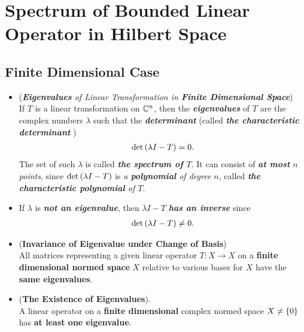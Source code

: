\documentclass[11pt]{article}
\begin{document}
\section{Spectrum of Bounded Linear Operator in Hilbert Space}
\subsection{Finite Dimensional Case}
\begin{itemize}
\item \begin{remark} (\emph{\textbf{Eigenvalues} of Linear Transformation in \textbf{Finite Dimensional Space}})\\
If $Τ$ is a linear transformation on ${\mathbb C}^n$, then the \emph{\textbf{eigenvalues}} of $Τ$ are the  complex numbers $\lambda$ such that the \emph{\textbf{determinant}} (called \emph{\textbf{the characteristic determinant}} )
\begin{align*}
\det\left(\lambda I - T\right) = 0.
\end{align*} The set of such $\lambda$ is called \emph{\textbf{the spectrum of $T$}}. It can consist of \emph{\textbf{at most} $n$ points}, since $\det\left(\lambda I - T\right)$ is \emph{a \textbf{polynomial} of degree $n$}, called \emph{\textbf{the characteristic polynomial} of $T$}.
\end{remark}

\item \begin{remark}
If $\lambda$ is \emph{\textbf{not an eigenvalue}}, then $\lambda I - T$ \emph{\textbf{has an inverse}} since 
\begin{align*}
\det\left(\lambda I - T\right) \neq 0.
\end{align*} 
\end{remark}

\item \begin{proposition} (\textbf{Invariance of Eigenvalue under Change of Basis}) \citep{kreyszig1989introductory}\\
All matrices representing a given linear operator $T: X \rightarrow X$ on a \textbf{finite dimensional normed space} $X$ relative to various bases for $X$ have the \textbf{same eigenvalues}.
\end{proposition}

\item \begin{theorem} (\textbf{The Existence of Eigenvalues}).  \citep{kreyszig1989introductory}\\
A linear operator on a \textbf{finite dimensional} complex normed space $X \neq \left\{0\right\}$ has \textbf{at least one eigenvalue}.
\end{theorem}
\end{itemize}
\end{document}
